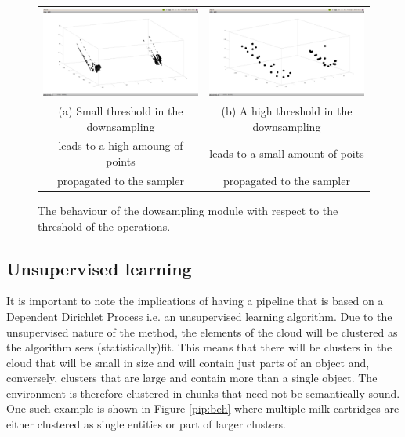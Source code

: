 \documentclass [twoside,hidelinks]{article}
\begin{document}
\begin{figure} [!ht]
\begin{tabular}{cc}
    \includegraphics [width=.4\textwidth]{smalldownsamplinglimit} &  \includegraphics [width=.4\textwidth]{largedownsamplinglimit} \\
     (a) Small threshold in the downsampling  &  (b) A high threshold in the downsampling  \\
        leads to  a high amoung of points    &     leads to a small amount of poits \\
        propagated to the sampler            &     propagated to the sampler  \\ [6pt]
\end{tabular}
\caption{The behaviour of the dowsampling module with respect to the threshold of the operations.}
  \label{pip:downsample}
\end{figure}
  
\subsection{Unsupervised learning}


It is important to note the implications of having a pipeline that is based on a Dependent Dirichlet Process i.e. an unsupervised learning algorithm. Due to the unsupervised nature of the method, the elements of the cloud will be clustered as the algorithm sees  (statistically)fit. This means that there will be clusters in the cloud that will be small in size and will contain just parts of an object and, conversely, clusters that are large and contain more than a single object. The environment is therefore clustered in chunks that need not be semantically sound. One such example is shown in Figure \ref{pip:beh} where multiple milk cartridges are either clustered as single entities or part of larger clusters.
\end{document}
